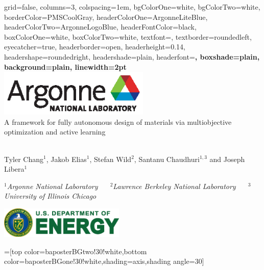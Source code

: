 \documentclass[a0paper,landscape]{baposter}
\begin{document}
\begin{poster}{
  grid=false,
  columns=3,
  colspacing=1em,
  bgColorOne=white,
  bgColorTwo=white,
  borderColor=PMSCoolGray,
  headerColorOne=ArgonneLiteBlue,
  headerColorTwo=ArgonneLogoBlue,
  headerFontColor=black,
  boxColorOne=white,
  boxColorTwo=white,
  textfont=\large,
  textborder=roundedleft,
  eyecatcher=true,
  headerborder=open,
  headerheight=0.14\textheight,
  headershape=roundedright,
  headershade=plain,
  headerfont=\Large\sf\bf, %
  boxshade=plain,
  background=plain,
  linewidth=2pt
  }
  {\includegraphics[height=6em]{../img/logos/Argonne_cmyk_black.eps}} %
  {\sf $\quad$\\A framework for fully autonomous design of materials via multiobjective optimization and active learning\\$\quad$}
  {\sf  \phantom{\hspace{0em}}
    Tyler Chang$^1$, Jakob Elias$^1$, Stefan Wild$^2$, Santanu Chaudhuri$^{1,3}$ and Joseph Libera$^1$\\

    \smallskip

    {\it \small
    $^1$Argonne National Laboratory $\quad$
    $^2$Lawrence Berkeley National Laboratory $\quad$
    $^3$University of Illinois Chicago\\
    \par
    }

  }
  {
    \includegraphics[height=4em]{../img/logos/DOE_logo_color_cmyk.eps}
  }

  =[top color=baposterBGtwo!30!white,bottom color=baposterBGone!30!white,shading=axis,shading angle=30]


\end{poster}
\end{document}
